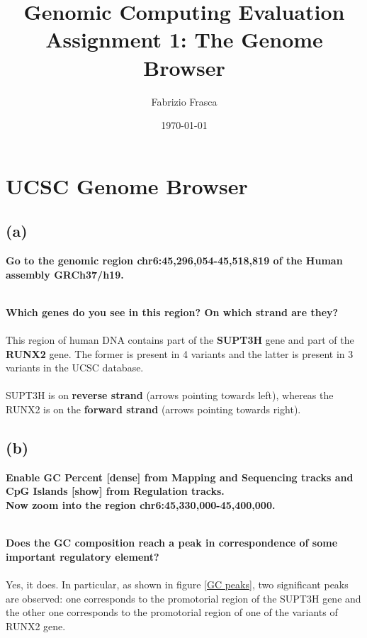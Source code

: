 \documentclass[12pt, a4paper]{article}
\title{\textbf{Genomic Computing Evaluation}\\Assignment 1: The Genome Browser}
\author{Fabrizio Frasca}
\date{\today}
\begin{document}
	
\maketitle
\clearpage

\section{UCSC Genome Browser}

\subsection*{(a)}

\textbf{Go to the genomic region chr6:45,296,054-45,518,819 of the Human assembly GRCh37/h19.}%

\textbf{\\ Which genes do you see in this region? On which strand are they?}%
\paragraph{} This region of human DNA contains part of the \textbf{SUPT3H} gene and part of the \textbf{RUNX2} gene. The former is present in 4 variants and the latter is present in 3 variants in the UCSC database.%
\paragraph{} SUPT3H is on \textbf{reverse strand} (arrows pointing towards left), whereas the RUNX2 is on the \textbf{forward strand} (arrows pointing towards right).	

\subsection*{(b)}

\textbf{Enable GC Percent [dense] from Mapping and Sequencing tracks and CpG Islands [show] from Regulation tracks.\\ Now zoom into the region chr6:45,330,000-45,400,000.}%

\textbf{\\ Does the GC composition reach a peak in correspondence of some important regulatory element?}%
\paragraph{}Yes, it does. In particular, as shown in figure \ref{GC peaks}, two significant peaks are observed: one corresponds to the promotorial region of the SUPT3H gene and the other one corresponds to the promotorial region of one of the variants of RUNX2 gene.
\end{document}
